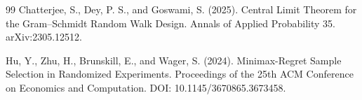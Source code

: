 \documentclass{article}
\begin{document}
\begin{thebibliography}{99}
   Chatterjee, S., Dey, P. S., and Goswami, S. (2025). Central Limit Theorem for the Gram--Schmidt Random Walk Design. Annals of Applied Probability 35. arXiv:2305.12512.

   Hu, Y., Zhu, H., Brunskill, E., and Wager, S. (2024). Minimax-Regret Sample Selection in Randomized Experiments. Proceedings of the 25th ACM Conference on Economics and Computation. DOI: 10.1145/3670865.3673458.

\end{thebibliography}
\end{document}
